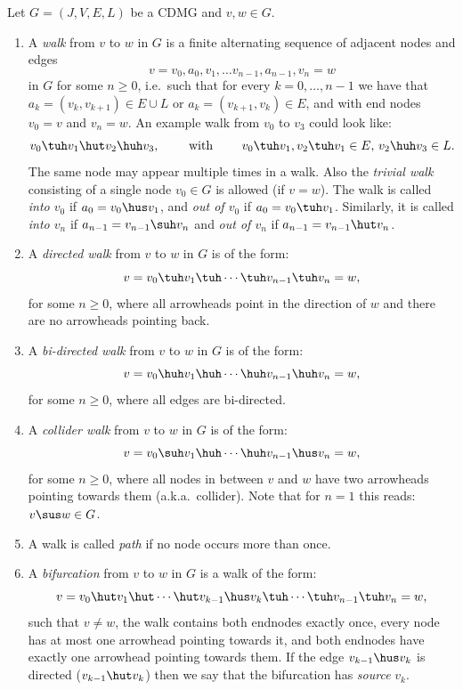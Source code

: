 \begin{Def}[Walks]
     Let $G=(J,V,E,L)$ be a CDMG and $v,w \in G$.
\begin{enumerate}
    \item A \emph{walk} from $v$ to $w$ in $G$ is a finite alternating sequence of adjacent nodes and edges 
      \[v=v_0, a_0,  v_1, \dots v_{n-1}, a_{n-1}, v_n=w\] 
        in $G$ for some $n \ge 0$, i.e.\ such that for every $k=0,\dots,n-1$ 
        we have that $a_k = (v_k, v_{k+1}) \in E \cup L$ or $a_k = (v_{k+1}, v_k) \in E$, and with end nodes $v_0=v$ and $v_n=w$.
        An example walk from $v_0$ to $v_3$ could look like:
        \[v_0 \tuh v_1 \hut  v_2 \huh v_3, \qquad\text{ with } \qquad  v_0 \tuh v_1, v_2 \tuh v_1 \in E,\,v_2 \huh v_3 \in L. \]
        The same node may appear multiple times in a walk.
        Also the \emph{trivial walk} consisting of a single node $v_0 \in G$ is allowed (if $v=w$).
        The walk is called \emph{into $v_0$} if $a_0 = v_0 \hus v_1$, and \emph{out of $v_0$} if $a_0 = v_0 \tuh v_1$.
        Similarly, it is called \emph{into $v_n$} if $a_{n-1} = v_{n-1} \suh v_n$ and \emph{out of $v_n$} if $a_{n-1} = v_{n-1} \hut v_n$.
    \item A \emph{directed walk} from $v$ to $w$ in $G$ is of the form:
        \[v=v_0 \tuh v_1 \tuh  \cdots \tuh v_{n-1} \tuh v_n=w,\]
        for some $n \ge 0$,
        where all arrowheads point in the direction of $w$ and there are no arrowheads pointing back.
    \item A \emph{bi-directed walk} from $v$ to $w$ in $G$ is of the form:
        \[v=v_0 \huh v_1 \huh  \cdots \huh v_{n-1} \huh v_n=w,\]
        for some $n \ge 0$, where all edges are bi-directed.
    \item A \emph{collider walk} from $v$ to $w$ in $G$ is of the form:
        \[v=v_0 \suh v_1 \huh  \cdots \huh v_{n-1} \hus v_n=w,\]
        for some $n \ge 0$, where all nodes in between $v$ and $w$ have two arrowheads pointing towards them (a.k.a.\ collider).
        Note that for $n=1$ this reads: $v\sus w \in G$.
    \item A walk is called \emph{path} if no node occurs more than once.
    \item A \emph{bifurcation} from $v$ to $w$ in $G$ is a walk of the form:
        \[v=v_0 \hut v_1 \hut  \cdots \hut v_{k-1} \hus v_k  \tuh \cdots \tuh v_{n-1} \tuh v_n=w,\]
        such that $v \ne w$, the walk contains both endnodes exactly once, 
        every node has at most one arrowhead pointing towards it, and 
        both endnodes have exactly one arrowhead pointing towards them. 
          If the edge $v_{k-1} \hus v_k$ is directed ($v_{k-1} \hut v_k$) then we say that the bifurcation has \emph{source} $v_{k}$.
  \end{enumerate}
\end{Def}



